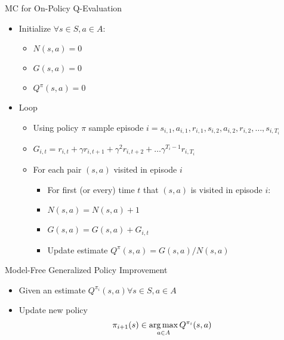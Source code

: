\documentclass[aspectratio=169]{../latex_main/tntbeamer}  %
\begin{document}
\begin{frame}[c]{MC for On-Policy Q-Evaluation}
	
	\begin{itemize}
		\item Initialize $\forall s\in S, a\in A$:
		\begin{itemize}
			\item $N(s,a) = 0$
			\item $G(s,a) = 0$
			\item $Q^\pi(s,a) =0$
		\end{itemize}
		\item Loop
		\begin{itemize}
			\item Using policy $\pi$ sample episode $i = s_{i,1}, a_{i,1}, r_{i,1}, s_{i,2}, a_{i,2}, r_{i,2}, \ldots, s_{i, T_i}$
			\item $G_{i,t} = r_{i,t} + \gamma r_{i,t+1} + \gamma^2 r_{i,t+2} + \ldots \gamma^{T_i -1} r_{i,T_i}$
			\item For each pair $(s,a)$ visited in episode $i$
			\begin{itemize}
				\item For first (or every) time $t$ that $(s,a)$ is visited in episode $i$:
				\item $N(s,a) = N(s,a) + 1$
				\item $G(s,a) = G(s,a) + G_{i,t}$
				\item Update estimate $Q^\pi(s,a) = G(s,a) /N(s,a)$
			\end{itemize}
		\end{itemize}
	\end{itemize}
	
\end{frame}
\begin{frame}[c]{Model-Free Generalized Policy Improvement}
	
	\begin{itemize}
		\item Given an estimate $Q^{\pi_i}(s,a) \forall s\in S, a \in A$
		\item Update new policy
		$$\pi_{i+1}(s) \in \operatorname*{arg\,max}_{a \in A} Q^{\pi_i} (s,a) $$
	\end{itemize}
	
\end{frame}
\end{document}
